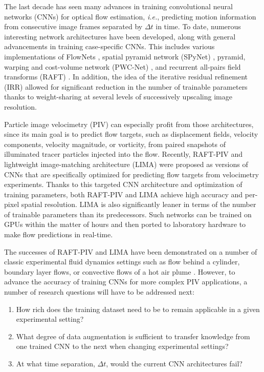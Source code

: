 \documentclass[a4paper,fleqn]{cas-dc}
\begin{document}
The last decade has seen many advances in training convolutional neural networks (CNNs) for optical flow estimation, \textit{i.e.}, predicting motion information from consecutive image frames separated by $\Delta t$ in time. To date, numerous interesting network architectures have been developed, along with general advancements in training case-specific CNNs. This includes various implementations of FlowNets \citep{dosovitskiy2015flownet, ilg2017flownet, hui2018liteflownet}, spatial pyramid network (SPyNet) \cite{ranjan2017optical}, pyramid, warping and cost-volume network (PWC-Net) \cite{sun2018pwc}, and recurrent all-pairs field transforms (RAFT) \cite{teed2020raft}. In addition, the idea of the iterative residual refinement (IRR) \cite{hur2019iterative} allowed for significant reduction in the number of trainable parameters thanks to weight-sharing at several levels of successively upscaling image resolution.

Particle image velocimetry (PIV) can especially profit from those architectures, since its main goal is to predict flow targets, such as displacement fields, velocity components, velocity magnitude, or vorticity, from paired snapshots of illuminated tracer particles injected into the flow. Recently, RAFT-PIV \cite{lagemann2021deep} and lightweight image-matching architecture (LIMA) \citep{manickathan2023lightweight} were proposed as versions of CNNs that are specifically optimized for predicting flow targets from velocimetry experiments. Thanks to this targeted CNN architecture and optimization of training parameters, both RAFT-PIV and LIMA achieve high accuracy and per-pixel spatial resolution. LIMA is also significantly leaner in terms of the number of trainable parameters than its predecessors. Such networks can be trained on GPUs within the matter of hours and then ported to laboratory hardware to make flow predictions in real-time.

The successes of RAFT-PIV and LIMA have been demonstrated on a number of classic experimental fluid dynamics settings such as flow behind a cylinder, boundary layer flows, or convective flows of a hot air plume \cite{mucignat2023lightweight}. However, to advance the accuracy of training CNNs for more complex PIV applications, a number of research questions will have to be addressed next:
\begin{enumerate}
\item How rich does the training dataset need to be to remain applicable in a given experimental setting?
\item What degree of data augmentation is sufficient to transfer knowledge from one trained CNN to the next when changing experimental settings?
\item At what time separation, $\Delta t$, would the current CNN architectures fail?
\end{enumerate}
\end{document}
